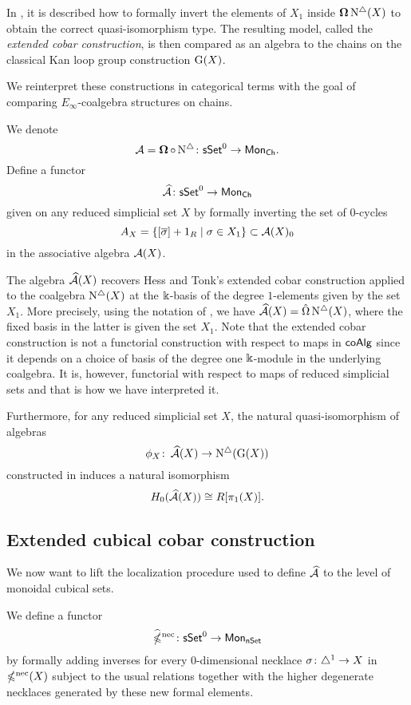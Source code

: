 In \cite{hess2010cobar}, it is described how to formally invert the elements of $X_1$ inside $\operatorname{\mathbf{\Omega}} \operatorname{N^{\triangle}}(X)$ to obtain the correct quasi-isomorphism type.
The resulting model, called the \textit{extended cobar construction}, is then compared as an algebra to the chains on the classical Kan loop group construction $\operatorname{G}(X)$.

We reinterpret these constructions in categorical terms with the goal of comparing $E_{\infty}$-coalgebra structures on chains. 

We denote
$$\operatorname{\mathcal{A}} = \operatorname{\mathbf{\Omega}} \circ \operatorname{N^{\triangle}} \colon \mathsf{sSet}^0 \to \mathsf{Mon}_{\mathsf{Ch}}.$$
Define a functor
\begin{equation*}
\operatorname{\mathcal{\widehat{A}}} \colon \mathsf{sSet}^0 \to \mathsf{Mon}_{\mathsf{Ch}}
\end{equation*}
given on any reduced simplicial set $X$ by formally inverting the set of $0$-cycles
\begin{equation*}
A_X = \{ [\overline{\sigma}]+1_R \mid \sigma \in X_1 \} \subset \operatorname{\mathcal{A}}(X)_0
\end{equation*}
in the associative algebra $\operatorname{\mathcal{A}}(X)$.

The algebra $\operatorname{\mathcal{\widehat{A}}}(X)$ recovers Hess and Tonk's extended cobar construction applied to the coalgebra $\operatorname{N^{\triangle}}(X)$ at the $\Bbbk$-basis of the degree $1$-elements given by the set $X_1$. More precisely, using the notation of \cite{hess2010cobar}, we have $\operatorname{\mathcal{\widehat{A}}}(X)= \hat{\Omega}\operatorname{N^{\triangle}}(X)$, where the fixed basis in the latter is given the set $X_1$. Note that the extended cobar construction is not a functorial construction with respect to maps in $\mathsf{coAlg}$ since it depends on a choice of basis of the degree one $\Bbbk$-module in the underlying coalgebra. It is, however, functorial with respect to maps of reduced simplicial sets and that is how we have interpreted it. 

Furthermore, for any reduced simplicial set $X$, the natural quasi-isomorphism of algebras 
\[\phi_X \colon \operatorname{\mathcal{\widehat{A}}}(X) \to \operatorname{N^{\triangle}}(\operatorname{G}(X)) \] 
constructed in \cite{hess2010cobar} induces a natural isomorphism
\begin{equation*}
H_0(\operatorname{\mathcal{\widehat{A}}}(X)) \cong R[\pi_1(X)].
\end{equation*}


\subsection{Extended cubical cobar construction}
We now want to lift the localization procedure used to define $\operatorname{\mathcal{\widehat{A}}}$ to the level of monoidal cubical sets.

We define a functor
\begin{equation*}
\operatorname{\widehat{\mathbb{\Omega}}^{\mathrm{nec}}} \colon \mathsf{sSet}^0 \to \mathsf{Mon}_{\mathsf{nSet}}
\end{equation*}
by formally adding inverses for every $0$-dimensional necklace $\sigma \colon \triangle^1 \to X$ in $\operatorname{\mathbb{\Omega}^{\mathrm{nec}}}(X)$ subject to the usual relations together with the higher degenerate necklaces generated by these new formal elements. 


